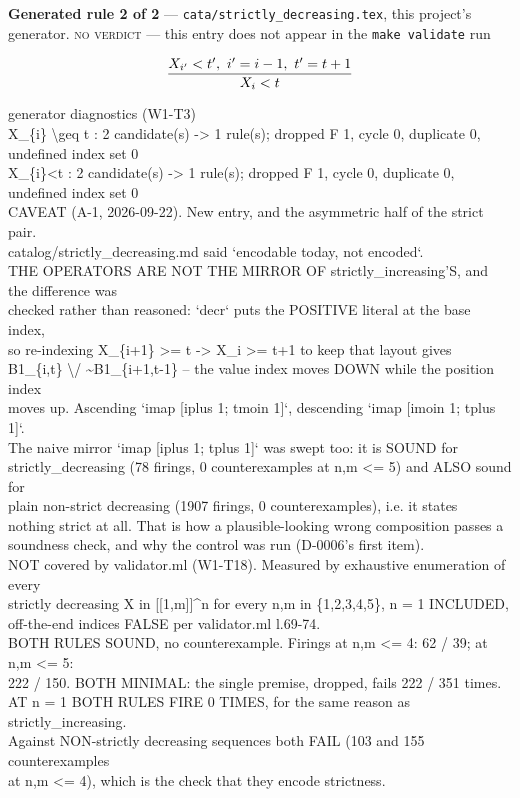 \documentclass[10pt,a4paper]{article}
\newcommand{\diag}[1]{{\small\itshape\raggedright #1\par}}
\newcommand{\rulebox}[1]{%
  \[\resizebox{\ifdim\width>\linewidth\linewidth\else\width\fi}{!}%
    {$\displaystyle #1$}\]}
\begin{document}
{\small\textbf{Generated rule 2 of 2} --- \texttt{cata/strictly\_decreasing.tex}, this project's generator. \textsc{no verdict} --- this entry does not appear in the \texttt{make validate} run\par}
\rulebox{\frac{X_{i'}<t',~i'=i-1,~t'=t+1}{X_{i}<t}}

\diag{generator diagnostics (W1-T3)\\{} X\_\{i\} \textbackslash{}geq t : 2 candidate(s) -> 1 rule(s); dropped F 1, cycle 0, duplicate 0, undefined index set 0\\{} X\_\{i\}<t : 2 candidate(s) -> 1 rule(s); dropped F 1, cycle 0, duplicate 0, undefined index set 0\\{} CAVEAT (A-1, 2026-09-22). New entry, and the asymmetric half of the strict pair.\\{} catalog/strictly\_decreasing.md said `encodable today, not encoded`.\\{} THE OPERATORS ARE NOT THE MIRROR OF strictly\_increasing'S, and the difference was\\{} checked rather than reasoned: `decr` puts the POSITIVE literal at the base index,\\{} so re-indexing X\_\{i+1\} >= t -> X\_i >= t+1 to keep that layout gives\\{} B1\_\{i,t\} \textbackslash{}/ \textasciitilde{}B1\_\{i+1,t-1\} -- the value index moves DOWN while the position index\\{} moves up. Ascending `imap [iplus 1; tmoin 1]`, descending `imap [imoin 1; tplus 1]`.\\{} The naive mirror `imap [iplus 1; tplus 1]` was swept too: it is SOUND for\\{} strictly\_decreasing (78 firings, 0 counterexamples at n,m <= 5) and ALSO sound for\\{} plain non-strict decreasing (1907 firings, 0 counterexamples), i.e. it states\\{} nothing strict at all. That is how a plausible-looking wrong composition passes a\\{} soundness check, and why the control was run (D-0006's first item).\\{} NOT covered by validator.ml (W1-T18). Measured by exhaustive enumeration of every\\{} strictly decreasing X in [[1,m]]\textasciicircum{}n for every n,m in \{1,2,3,4,5\}, n = 1 INCLUDED,\\{} off-the-end indices FALSE per validator.ml l.69-74.\\{} BOTH RULES SOUND, no counterexample. Firings at n,m <= 4: 62 / 39; at n,m <= 5:\\{} 222 / 150. BOTH MINIMAL: the single premise, dropped, fails 222 / 351 times.\\{} AT n = 1 BOTH RULES FIRE 0 TIMES, for the same reason as strictly\_increasing.\\{} Against NON-strictly decreasing sequences both FAIL (103 and 155 counterexamples\\{} at n,m <= 4), which is the check that they encode strictness.}
\end{document}
